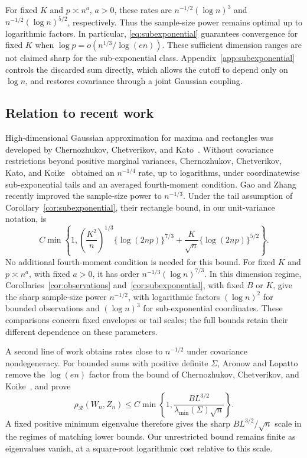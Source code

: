 \documentclass[11pt,letterpaper]{article}
\theoremstyle{remark}
\newcommand{\rh}{\rho_{\mathcal R}}
\begin{document}
For fixed \(K\) and \(p\asymp n^a\), \(a>0\), these rates are
\(n^{-1/2}(\log n)^3\) and
\(n^{-1/2}(\log n)^{5/2}\), respectively. Thus the sample-size
power remains optimal up to logarithmic factors. In particular,
\eqref{eq:subexponential} guarantees convergence for fixed \(K\) when
\(\log p=o(n^{1/3}/\log(en))\). These sufficient dimension ranges
are not claimed sharp for the sub-exponential class.
Appendix~\ref{app:subexponential} controls the discarded sum directly,
which allows the cutoff to depend only on \(\log n\), and restores
covariance through a joint Gaussian coupling.

\subsection{Relation to recent work}\label{sec:literature}
High-dimensional Gaussian approximation for maxima and rectangles was
developed by Chernozhukov, Chetverikov, and Kato~\cite{CCK2013,CCK2017}.
Without covariance restrictions beyond positive marginal variances,
Chernozhukov, Chetverikov, Kato, and Koike~\cite[Theorem~2.1]{CCKK2022}
obtained an \(n^{-1/4}\) rate, up to logarithms, under coordinatewise
sub-exponential tails and an averaged fourth-moment condition.
Gao and Zhang~\cite[Theorem~1 and Section~5]{GaoZhang} recently improved
the sample-size power to \(n^{-1/3}\). Under the tail assumption of
Corollary~\ref{cor:subexponential}, their rectangle bound, in our
unit-variance notation, is
\begin{equation*}
 C\min\left\{1,
 \left(\frac{K^2}{n}\right)^{1/3}\{\log(2np)\}^{7/3}
 +\frac K{\sqrt n}\{\log(2np)\}^{5/2}\right\}.
\end{equation*}
No additional fourth-moment condition is needed for this bound.
For fixed \(K\) and \(p\asymp n^a\), with fixed \(a>0\), it has
order \(n^{-1/3}(\log n)^{7/3}\). In this dimension regime,
Corollaries~\ref{cor:observations} and~\ref{cor:subexponential}, with
fixed \(B\) or \(K\), give the sharp sample-size power
\(n^{-1/2}\), with logarithmic factors \((\log n)^2\) for bounded
observations and \((\log n)^3\) for sub-exponential coordinates.
These comparisons concern fixed envelopes or tail scales; the full
bounds retain their different dependence on these parameters.

A second line of work obtains rates close to \(n^{-1/2}\) under
covariance nondegeneracy. For bounded sums with positive definite
\(\Sigma\), Aronow and Lopatto~\cite[Theorem~1.1]{AL} remove the
\(\log(en)\) factor from the bound of Chernozhukov, Chetverikov,
and Koike~\cite[Corollary~2.1]{CCK}, and prove
\begin{equation*}
 \rh(W_n,Z_n)\le C\min\left\{1,
 \frac{BL^{3/2}}{\lambda_{\min}(\Sigma)\sqrt n}\right\}.
\end{equation*}
A fixed positive minimum eigenvalue therefore gives the sharp
\(BL^{3/2}/\sqrt n\) scale in the regimes of matching lower bounds.
Our unrestricted bound remains finite as eigenvalues vanish, at a
square-root logarithmic cost relative to this scale.
\end{document}
